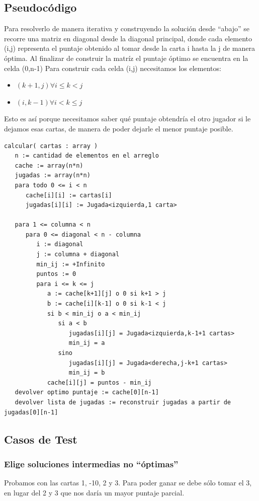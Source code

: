 \subsection{Pseudoc\'odigo}
Para resolverlo de manera iterativa y construyendo la solución desde ``abajo'' se recorre una matriz
en diagonal desde la diagonal principal, donde cada elemento (i,j) representa el puntaje obtenido
al tomar desde la carta i hasta la j de manera óptima. Al finalizar de construir la matríz el puntaje
óptimo se encuentra en la celda (0,n-1)
Para construir cada celda (i,j) necesitamos los elementos:

\begin{itemize}
   \item $(k+1,j) \forall i \le k < j$
   \item $(i,k-1) \forall i < k \le j$
\end{itemize}

Esto es así porque necesitamos saber qué puntaje obtendría el otro jugador si le dejamos esas cartas,
de manera de poder dejarle el menor puntaje posible.

\begin{verbatim}
calcular( cartas : array )
   n := cantidad de elementos en el arreglo
   cache := array(n*n)
   jugadas := array(n*n)
   para todo 0 <= i < n
      cache[i][i] := cartas[i]
      jugadas[i][i] := Jugada<izquierda,1 carta>

   para 1 <= columna < n
      para 0 <= diagonal < n - columna
         i := diagonal
         j := columna + diagonal
         min_ij := +Infinito
         puntos := 0
         para i <= k <= j
            a := cache[k+1][j] o 0 si k+1 > j
            b := cache[i][k-1] o 0 si k-1 < j
            si b < min_ij o a < min_ij
               si a < b
                  jugadas[i][j] = Jugada<izquierda,k-1+1 cartas>
                  min_ij = a
               sino
                  jugadas[i][j] = Jugada<derecha,j-k+1 cartas>
                  min_ij = b
            cache[i][j] = puntos - min_ij
   devolver optimo puntaje := cache[0][n-1]
   devolver lista de jugadas := reconstruir jugadas a partir de jugadas[0][n-1]
\end{verbatim}

\subsection{Casos de Test}

\subsubsection{Elige soluciones intermedias no ``\'optimas''}
Probamos con las cartas 1, -10, 2 y 3. Para poder ganar se debe sólo tomar el 3, en lugar del 2 y 3 que nos daría un mayor puntaje parcial.

